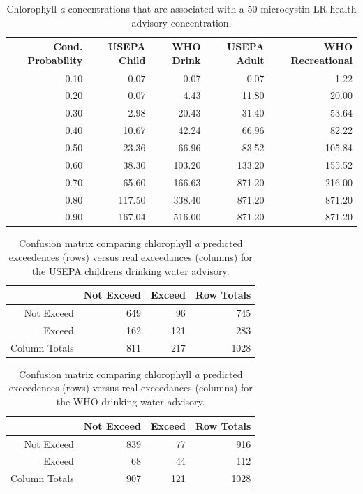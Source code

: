 \documentclass[10pt,a4paper,twocolumn]{article}
\begin{document}
\begin{table}[ht]
\caption{Chlorophyll \textit{a} concentrations that are 
                     associated with a 50%
                     microcystin-LR health advisory concentration.} 
\label{mc_chla_table}
\begin{tabular}{rrrrr}
  \hline
Cond. Probability & USEPA Child & WHO Drink & USEPA Adult & WHO Recreational \\ 
  \hline
0.10 & 0.07 & 0.07 & 0.07 & 1.22 \\ 
  0.20 & 0.07 & 4.43 & 11.80 & 20.00 \\ 
  0.30 & 2.98 & 20.43 & 31.40 & 53.64 \\ 
  0.40 & 10.67 & 42.24 & 66.96 & 82.22 \\ 
  0.50 & 23.36 & 66.96 & 83.52 & 105.84 \\ 
  0.60 & 38.30 & 103.20 & 133.20 & 155.52 \\ 
  0.70 & 65.60 & 166.63 & 871.20 & 216.00 \\ 
  0.80 & 117.50 & 338.40 & 871.20 & 871.20 \\ 
  0.90 & 167.04 & 516.00 & 871.20 & 871.20 \\ 
   \hline
\end{tabular}
\end{table}

\begin{table}[ht]
\caption{Confusion matrix comparing chlorophyll \textit{a} 
                     predicted exceedences (rows) versus real exceedances 
                     (columns) for the USEPA childrens drinking water advisory.} 
\label{child_conmat_table}
\begin{tabular}{rrrr}
  \hline
 & Not Exceed & Exceed & Row Totals \\ 
  \hline
Not Exceed & 649 &  96 & 745 \\ 
  Exceed & 162 & 121 & 283 \\ 
  Column Totals & 811 & 217 & 1028 \\ 
   \hline
\end{tabular}
\end{table}

\begin{table}[ht]
\caption{Confusion matrix comparing chlorophyll \textit{a} 
                     predicted exceedences (rows) versus real exceedances 
                     (columns) for the WHO drinking water advisory.} 
\label{who_drink_conmat_table}
\begin{tabular}{rrrr}
  \hline
 & Not Exceed & Exceed & Row Totals \\ 
  \hline
Not Exceed & 839 &  77 & 916 \\ 
  Exceed &  68 &  44 & 112 \\ 
  Column Totals & 907 & 121 & 1028 \\ 
   \hline
\end{tabular}
\end{table}
\end{document}
